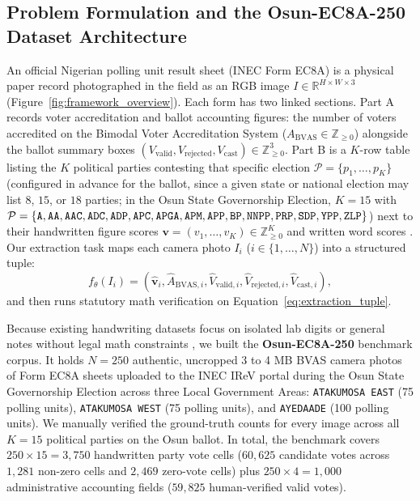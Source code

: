 \documentclass{article}
\begin{document}
\subsection{Problem Formulation and the Osun-EC8A-250 Dataset Architecture}

An official Nigerian polling unit result sheet (INEC Form EC8A) is a physical paper record photographed in the field as an RGB image $I \in \mathbb{R}^{H \times W \times 3}$ (Figure~\ref{fig:framework_overview}). Each form has two linked sections. Part A records voter accreditation and ballot accounting figures: the number of voters accredited on the Bimodal Voter Accreditation System ($A_{\text{BVAS}} \in \mathbb{Z}_{\ge 0}$) alongside the ballot summary boxes $(V_{\text{valid}}, V_{\text{rejected}}, V_{\text{cast}}) \in \mathbb{Z}_{\ge 0}^3$. Part B is a $K$-row table listing the $K$ political parties contesting that specific election $\mathcal{P} = \{p_1, \dots, p_K\}$ (configured in advance for the ballot, since a given state or national election may list $8$, $15$, or $18$ parties; in the Osun State Governorship Election, $K = 15$ with $\mathcal{P} = \{\text{\texttt{A}}, \text{\texttt{AA}}, \text{\texttt{AAC}}, \text{\texttt{ADC}}, \text{\texttt{ADP}}, \text{\texttt{APC}}, \text{\texttt{APGA}}, \text{\texttt{APM}}, \text{\texttt{APP}}, \text{\texttt{BP}}, \text{\texttt{NNPP}}, \text{\texttt{PRP}}, \text{\texttt{SDP}}, \text{\texttt{YPP}}, \text{\texttt{ZLP}}\}$) next to their handwritten figure scores $\mathbf{v} = (v_1, \dots, v_K) \in \mathbb{Z}_{\ge 0}^K$ and written word scores \cite{inec2022electoral}. Our extraction task maps each camera photo $I_i$ ($i \in \{1, \dots, N\}$) into a structured tuple:
\begin{equation}
f_{\theta}(I_i) = \left(\hat{\mathbf{v}}_i, \hat{A}_{\text{BVAS}, i}, \hat{V}_{\text{valid}, i}, \hat{V}_{\text{rejected}, i}, \hat{V}_{\text{cast}, i}\right),
\label{eq:extraction_tuple}
\end{equation}
and then runs statutory math verification on Equation~\ref{eq:extraction_tuple}.

Because existing handwriting datasets focus on isolated lab digits \cite{lecun1998gradient,gondere2016election} or general notes without legal math constraints \cite{zhang2026wildhandbench,ouyang2025omnidocbench}, we built the \textbf{Osun-EC8A-250} benchmark corpus. It holds $N = 250$ authentic, uncropped 3 to 4 MB BVAS camera photos of Form EC8A sheets uploaded to the INEC IReV portal during the Osun State Governorship Election across three Local Government Areas: \texttt{ATAKUMOSA EAST} (75 polling units), \texttt{ATAKUMOSA WEST} (75 polling units), and \texttt{AYEDAADE} (100 polling units). We manually verified the ground-truth counts for every image across all $K = 15$ political parties on the Osun ballot. In total, the benchmark covers $250 \times 15 = 3,750$ handwritten party vote cells ($60,625$ candidate votes across $1,281$ non-zero cells and $2,469$ zero-vote cells) plus $250 \times 4 = 1,000$ administrative accounting fields ($59,825$ human-verified valid votes).
\end{document}
